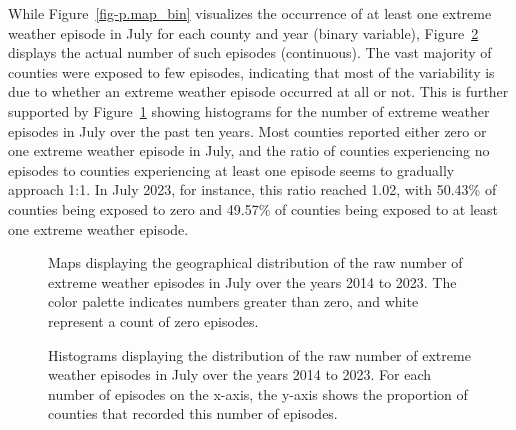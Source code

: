 \documentclass[
  letterpaper,
  DIV=11,
  numbers=noendperiod]{scrartcl}
\begin{document}
While Figure~\ref{fig-p.map_bin} visualizes the occurrence of at least
one extreme weather episode in July for each county and year (binary
variable), Figure~\ref{fig-p.hist_cont} displays the actual number of
such episodes (continuous). The vast majority of counties were exposed
to few episodes, indicating that most of the variability is due to
whether an extreme weather episode occurred at all or not. This is
further supported by Figure~\ref{fig-p.map_cont} showing histograms for
the number of extreme weather episodes in July over the past ten years.
Most counties reported either zero or one extreme weather episode in
July, and the ratio of counties experiencing no episodes to counties
experiencing at least one episode seems to gradually approach 1:1. In
July 2023, for instance, this ratio reached 1.02, with 50.43\% of
counties being exposed to zero and 49.57\% of counties being exposed to
at least one extreme weather episode.

\begin{figure}[h]


\caption{\label{fig-p.map_cont}Maps displaying the geographical
distribution of the raw number of extreme weather episodes in July over
the years 2014 to 2023. The color palette indicates numbers greater than
zero, and white represent a count of zero episodes.}

\end{figure}%

\begin{figure}[h]


\caption{\label{fig-p.hist_cont}Histograms displaying the distribution
of the raw number of extreme weather episodes in July over the years
2014 to 2023. For each number of episodes on the x-axis, the y-axis
shows the proportion of counties that recorded this number of episodes.}

\end{figure}%
\end{document}
